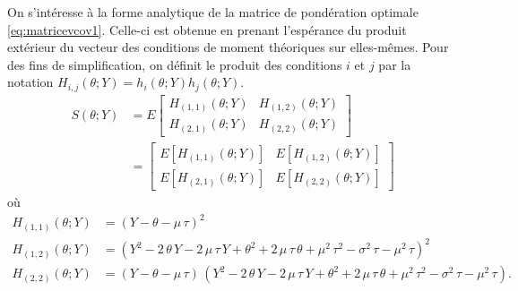 On s'intéresse à la forme analytique de la matrice de pondération
optimale \eqref{eq:matricevcov1}. Celle-ci est obtenue en prenant
l'espérance du produit extérieur du vecteur des conditions de moment
théoriques sur elles-mêmes.  Pour des fins de simplification, on
définit le produit des conditions $i$ et $j$ par la notation
$H_{i,j}(\theta;Y) = h_i(\theta;Y)h_j(\theta;Y)$.
\begin{align}
  S(\theta;Y) &= E \left[\begin{array}{cc}
      H_{(1,1)}(\theta;Y) & H_{(1,2)}(\theta;Y) \\
      H_{(2,1)}(\theta;Y) & H_{(2,2)}(\theta;Y)
    \end{array} \right] \nonumber\\
  &= \left[\begin{array}{cc}
      E \left[H_{(1,1)}(\theta;Y)\right] & E \left[H_{(1,2)}(\theta;Y)\right] \\ 
      E \left[H_{(2,1)}(\theta;Y)\right] & E \left[H_{(2,2)}(\theta;Y)\right] 
    \end{array} \right]
\end{align}
où
\begin{align*}
  H_{(1,1)}(\theta;Y) &=\left( Y-\theta-\mu\,\tau\right)^{2} \\
  H_{(1,2)}(\theta;Y) &=\left( {Y}^{2}-2\,\theta\,Y-2\,\mu\,\tau\,Y+{\theta}^{2}+2\,\mu\,\tau\,\theta+{\mu}^{2}\,{\tau}^{2}-{\sigma}^{2}\,\tau-{\mu}^{2}\,\tau\right)^{2} \\
  H_{(2,2)}(\theta;Y) &=\left( Y-\theta-\mu\,\tau\right) \,\left(
    {Y}^{2}-2\,\theta\,Y-2\,\mu\,\tau\,Y+{\theta}^{2}+2\,\mu\,\tau\,\theta+{\mu}^{2}\,{\tau}^{2}-{\sigma}^{2}\,\tau-{\mu}^{2}\,\tau\right).
\end{align*}

